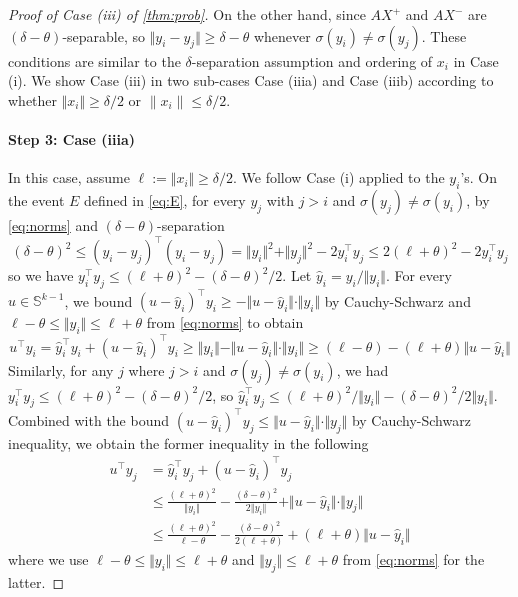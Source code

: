\documentclass[aoap]{imsart}
\numberwithin{equation}{section}
\theoremstyle{definition}
\theoremstyle{remark}
\renewcommand{\hat}{\widehat}
\numberwithin{equation}{section}
\renewcommand{\S}{\mathbb{S}}
\newcommand{\0}{\mathbf{0}}
\newcommand{\1}{\mathbf{1}}
\renewcommand{\S}{\mathbb{S}}
\numberwithin{equation}{section}
\begin{document}
\begin{proof}[Proof of Case (iii) of \cref{thm:prob}]
On the other hand,  since $AX^+$ and $AX^-$ are $(\delta -\theta)$-separable, so $\Vert y_i -y_j\Vert\geq \delta -\theta$ whenever $\sigma (y_i)\neq\sigma (y_j)$. These conditions are similar to the $\delta$-separation assumption and ordering of $x_i$ in Case (i). We show Case (iii) in two sub-cases Case (iiia) and Case (iiib) according to whether $\Vert x_i\Vert \geq\delta/2$ or $\|x_i\|\leq \delta/2$.

\paragraph{Step 3: Case (iiia)}
In this case, assume $\ell:=\Vert x_i\Vert\geq \delta/2$. We follow Case (i) applied to the $y_i$'s. On the event $E$ defined in \eqref{eq:E}, for every $y_j$ with $j>i$ and $\sigma(y_j)\neq \sigma (y_i)$, by \eqref{eq:norms} and $(\delta-\theta)$-separation
\[
(\delta-\theta)^{2}\leq (y_{i}-y_{j})^{\intercal}(y_{i}-y_{j}) = \Vert y_{i}\Vert ^{2}+\Vert y_{j}\Vert^{2}-2y_{i}^{\intercal}y_{j} \leq 2(\ell +\theta) ^{2}-2y_{i}^{\intercal}y_{j}
\]
so we have $y_{i}^{\intercal}y_{j}\leq (\ell+\theta)^2-(\delta - \theta)^{2}/2$. Let $\hat{y}_{i}=y_{i}/\Vert y_{i}\Vert$. For every $u\in \S^{k-1}$, we bound $(u-\hat{y}_i)^{\intercal}y_i\geq -\Vert u-\hat{y}_i\Vert \cdot \Vert y_i\Vert $ by Cauchy-Schwarz and $\ell-\theta\leq \Vert y_i\Vert \leq \ell+\theta$ from \eqref{eq:norms} to obtain
\begin{equation}\label{eq:uyi}
  u^{\intercal}y_{i} = \hat{y}_{i}^{\intercal}y_{i} + \left(u-\hat{y}_{i}\right)^{\intercal}y_{i} \geq \Vert y_{i}\Vert - \Vert u-\hat{y}_{i}\Vert \cdot \Vert y_{i}\Vert\geq (\ell-\theta) - (\ell+\theta)\Vert u-\hat{y}_{i}\Vert   
\end{equation}
Similarly, for any $j$ where $j>i$ and $\sigma (y_j)\neq\sigma(y_i)$, we had $y_{i}^{\intercal}y_{j}\leq (\ell+\theta)^2-(\delta - \theta)^{2}/2$, so $\hat{y}_{i}^{\intercal}y_{j}\leq (\ell+\theta)^2/\Vert y_i\Vert -(\delta - \theta)^{2}/2\Vert y_i\Vert$. Combined with the bound $(u-\hat{y}_i)^{\intercal}y_j\leq \Vert u-\hat{y}_i\Vert \cdot \Vert y_j\Vert $ by Cauchy-Schwarz inequality, we obtain the former inequality in the following
\begin{align}\label{eq:uyj}
u^{\intercal}y_{j} & = \hat{y}_{i}^{\intercal}y_{j} + \left(u-\hat{y}_{i}\right)^{\intercal}y_{j} \nonumber
\\ & \leq \frac{(\ell+\theta)^2}{\Vert y_i\Vert } - \frac{(\delta-\theta)^2}{2\Vert y_i\Vert }+ \Vert u-\hat{y}_{i}\Vert\cdot \Vert y_{j}\Vert \nonumber
\\ & \leq \frac{(\ell+\theta)^2}{\ell-\theta} - \frac{(\delta -\theta)^2}{2(\ell+\theta)}+(\ell+\theta)\Vert u-\hat{y}_i\Vert
\end{align}
where we use $\ell-\theta\leq \Vert y_i\Vert\leq \ell+\theta $ and $\Vert y_j\Vert \leq \ell+\theta$ from \eqref{eq:norms} for the latter.


\end{proof}
\end{document}
